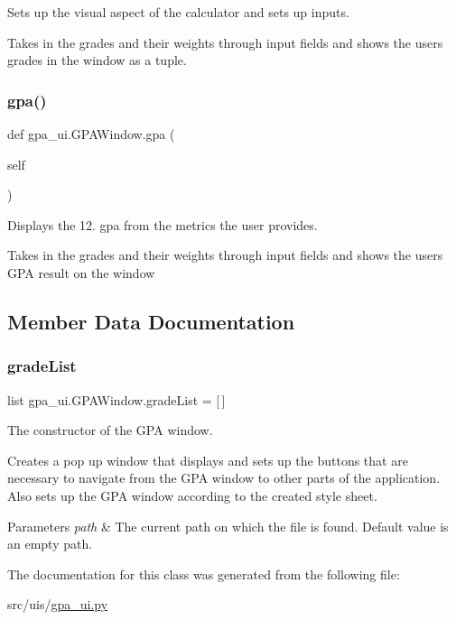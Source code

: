 Sets up the visual aspect of the calculator and sets up inputs. 

Takes in the grades and their weights through input fields and shows the users grades in the window as a tuple. \mbox{\label{classgpa__ui_1_1_g_p_a_window_a36e992cfdee2fc99be76c95f6a342249}} 
\subsubsection{\texorpdfstring{gpa()}{gpa()}}
{\footnotesize\ttfamily def gpa\+\_\+ui.\+G\+P\+A\+Window.\+gpa (\begin{DoxyParamCaption}\item[{}]{self }\end{DoxyParamCaption})}



Displays the 12. gpa from the metrics the user provides. 

Takes in the grades and their weights through input fields and shows the users G\+PA result on the window 

\subsection{Member Data Documentation}
\mbox{\label{classgpa__ui_1_1_g_p_a_window_a4a3352cb97e9c399dba7b5bf358e4938}} 
\subsubsection{\texorpdfstring{grade\+List}{gradeList}}
{\footnotesize\ttfamily list gpa\+\_\+ui.\+G\+P\+A\+Window.\+grade\+List = \mbox{[}$\,$\mbox{]}\hspace{0.3cm}{\ttfamily [static]}}



The constructor of the G\+PA window. 

Creates a pop up window that displays and sets up the buttons that are necessary to navigate from the G\+PA window to other parts of the application. Also sets up the G\+PA window according to the created style sheet. 
\begin{DoxyParams}{Parameters}
{\em path} & The current path on which the file is found. Default value is an empty path. \\
\hline
\end{DoxyParams}


The documentation for this class was generated from the following file\+:\begin{DoxyCompactItemize}
\item 
src/uis/\hyperlink{gpa__ui_8py}{gpa\+\_\+ui.\+py}\end{DoxyCompactItemize}
